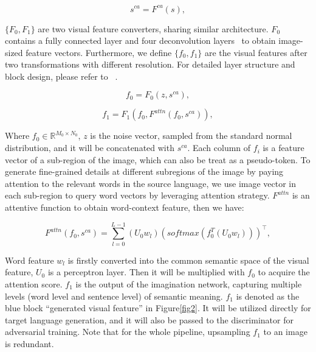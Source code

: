 \documentclass[11pt]{article}
\begin{document}
\begin{equation}
    s^{ca}=F^{ca}(s),
\end{equation}

$\{F_{0}, F_{1}\}$ are two visual feature converters, sharing similar architecture. $F_{0}$ contains a fully connected layer and four deconvolution layers~\cite{Noh2015LearningDN} to obtain image-sized feature vectors. Furthermore, we define $\{f_{0}, f_{1}\}$ are the visual features after two transformations with different resolution. For detailed layer structure and block design, please refer to ~\cite{xu2018attngan}.

\begin{equation}
    f_{0}=F_{0}(z,s^{ca}),
\end{equation}

\begin{equation}
    f_{1}=F_{1}(f_{0},F^{attn}(f_{0},s^{ca})),
\label{equation 7}
\end{equation}

Where $f_{0}\in \mathbb{R}^{M_{0}\times N_{0}}$, $z$ is the noise vector, sampled from the standard normal distribution, and it will be concatenated with $s^{ca}$. Each column of $f_{i}$ is a feature vector of a sub-region of the image, which can also be treat as a pseudo-token. To generate fine-grained details at different subregions of the image by paying attention to the relevant words in the source language, we use image vector in each sub-region to query word vectors by leveraging attention strategy. $F^{attn}$ is an attentive function to obtain word-context feature, then we have:

\begin{small}
\begin{equation}
    F^{attn}(f_{0},s^{ca})=\sum _{l=0}^{L-1} (U_{0}w_{l})(softmax(f_{0}^{T}(U_{0}w_{l})))^\top ,
\end{equation}
\end{small}


Word feature $w_{l}$ is firstly converted into the common semantic space of the visual feature, $U_{0}$ is a perceptron layer. Then it will be multiplied with $f_{0}$ to acquire the attention score. $f_{1}$ is the output of the imagination network, capturing multiple levels (word level and sentence level) of semantic meaning. $f_{1}$ is denoted as the blue block ``generated visual feature'' in Figure\ref{fig2}. It will be utilized directly for target language generation, and it will also be passed to the discriminator for adversarial training. Note that for the whole pipeline, upsampling $f_{1}$ to an image is redundant.
\end{document}
